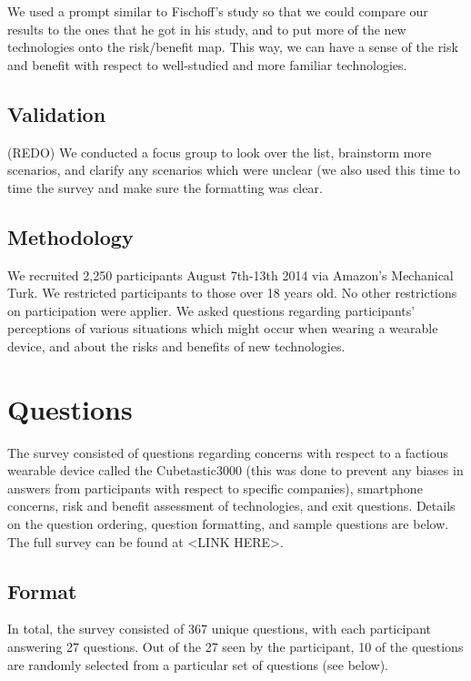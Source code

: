 \documentclass{acm_proc_article-sp}
\begin{document}
We used a prompt similar to Fischoff's study so that we could compare our results to the ones that he got in his study, and to put more of the new technologies onto the risk/benefit map. This way, we can have a sense of the risk and benefit with respect to well-studied and more familiar technologies. 

\subsection{Validation}
(REDO) We conducted a focus group to look over the list, brainstorm more scenarios, and clarify any scenarios which were unclear (we also used this time to time the survey and make sure the formatting was clear. 

\subsection{Methodology}
We recruited 2,250 participants August 7th-13th 2014 via Amazon's Mechanical Turk. We restricted participants to those over 18 years old. No other restrictions on participation were applier. We asked questions regarding participants' perceptions of various situations which might occur when wearing a wearable device, and about the risks and benefits of new technologies.
 
 
\section{Questions}
The survey consisted of questions regarding concerns with respect to a factious wearable device called the Cubetastic3000 (this was done to prevent any biases in answers from participants with respect to specific companies), smartphone concerns, risk and benefit assessment of technologies, and exit questions. Details on the question ordering, question formatting, and sample questions are below. The full survey can be found at <LINK HERE>. 

\subsection{Format}
In total, the survey consisted of 367 unique questions, with each participant answering 27 questions. Out of the 27 seen by the participant, 10 of the questions are randomly selected from a particular set of questions (see below).   \\[-.8cm]
\end{document}
